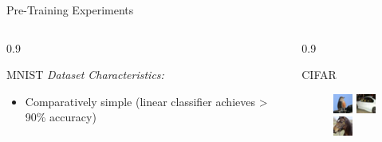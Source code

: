 \documentclass[final]{beamer}
\newlength{\onecolwid}
\newlength{\threecolwid}
\begin{document}
\begin{frame}[t]
\begin{columns}[t]
\begin{column}{\threecolwid}
\begin{alertblock}{Pre-Training Experiments}
\begin{columns}[t, totalwidth=0.9\threecolwid]
\begin{column}{0.9\onecolwid}
\begin{block}{MNIST}
\emph{Dataset Characteristics:}

\begin{itemize}
	\item Comparatively simple (linear classifier achieves > 90\% accuracy)
\end{itemize}

\end{block}
\end{column}

\begin{column}{0.9\onecolwid}
\begin{block}{CIFAR}
\begin{figure}
\centering
\includegraphics[width=0.2\linewidth]{graphics/reconstructions/cifar/input_00.png}
\includegraphics[width=0.2\linewidth]{graphics/reconstructions/cifar/input_01.png}
\includegraphics[width=0.2\linewidth]{graphics/reconstructions/cifar/input_02.png}


\end{figure}
\end{block}
\end{column}
\end{columns}
\end{alertblock}
\end{column}
\end{columns}
\end{frame}
\end{document}
